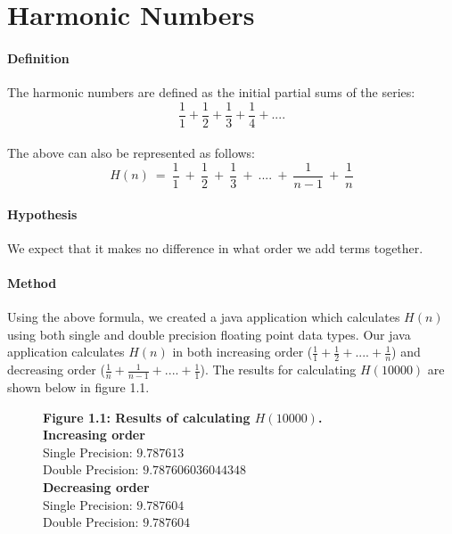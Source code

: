 \documentclass[12pt]{article}
\begin{document}
\section{Harmonic Numbers}
\paragraph{Definition}
	The harmonic numbers are defined as the initial partial sums of the series:
	{\large $$\frac{1}{1} + \frac{1}{2} + \frac{1}{3} + \frac{1}{4} + ....$$}\\
	The above can also be represented as follows:
	{\large $$H(n)\ = \ \frac{1}{1} \ + \ \frac{1}{2} \ + \ \frac{1}{3} \ + \ .... \ +  \ \frac{1}{n-1} \ + \ \frac{1}{n}$$}
	
\paragraph{Hypothesis}
	We expect that it makes no difference in what order we add terms together.

\paragraph{Method}
	Using the above formula, we created a java application which calculates $H(n)$ using both single and double precision floating point data types. Our java application calculates $H(n)$ in both increasing order ($\frac{1}{1} + \frac{1}{2} +  .... + \frac{1}{n}$) and decreasing order ($\frac{1}{n} + \frac{1}{n - 1} +  .... + \frac{1}{1}$). The results for calculating $H(10000)$ are shown below in figure 1.1.
	
\begin{figure}[h]
	\textbf{Figure 1.1: Results of calculating $H(10000)$.}\\
	\textbf{Increasing order}\\
	Single Precision: $9.787613$\\
	Double Precision: $9.787606036044348$\\
	\textbf{Decreasing order}\\
	Single Precision: $9.787604$\\
	Double Precision: $9.787604$	
\end{figure}
\end{document}
